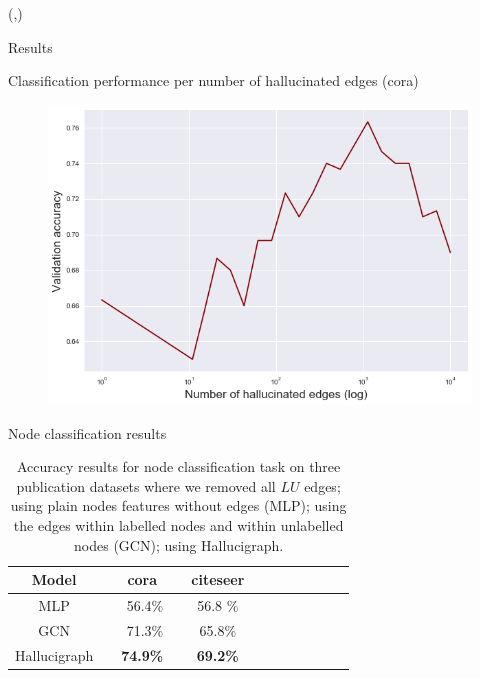 \documentclass[final]{beamer}
\begin{document}
\begin{frame}[fragile]{}
\begin{textblock}{\colwidth}(\thirdcolpos,\vstartCols)




\begin{paddedBlock}{Results}

\alert{Classification performance per number of hallucinated edges (cora)}
  \begin{figure}
      \centering
      \includegraphics[width=.8\textwidth]{img/acc_vs_topk.png}
      \label{fig:coins}
  \end{figure}

\alert{Node classification results}

\begin{table}[h!]\centering
\begin{tabular}{@{}rr|rrcrrrcrrr@{}}\toprule
\multicolumn{1}{c}{Model} & \phantom{abc}  &\multicolumn{1}{c}{cora} & \phantom{abc}  & \multicolumn{1}{c}{citeseer}  \\
\midrule
\midrule
\multicolumn{1}{c}{MLP} & \phantom{abc}  &56.4\% &  &56.8 \%   \\
\midrule
\multicolumn{1}{c}{GCN} & \phantom{abc}  &71.3\% &  & 65.8\%   \\
\midrule
\multicolumn{1}{c}{Hallucigraph} & \phantom{abc}  &\textbf{74.9\%} &  & \textbf{69.2\%}   \\
\bottomrule
\end{tabular}
\caption{Accuracy results for node classification task on three publication datasets where we removed all $LU$ edges; using plain nodes features without edges (MLP); using the edges within labelled nodes and within unlabelled nodes (GCN); using Hallucigraph.}
\label{restable}
\end{table}


\end{paddedBlock}
\end{textblock}
\end{frame}
\end{document}
